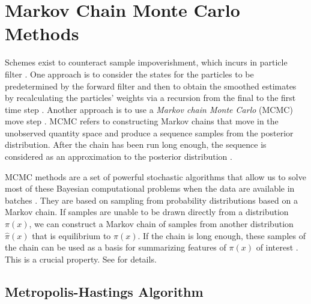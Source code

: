 \section{Markov Chain Monte Carlo Methods}


Schemes exist to counteract sample impoverishment, which incurs in particle filter \citep{ristic2004beyond}. One approach is to consider the states for the particles to be predetermined by the forward filter and then to obtain the smoothed estimates by recalculating the particles' weights via a recursion from the final to the first time step \citep{godsill2000methodology}. Another approach is to use a \textit{Markov chain Monte Carlo} (MCMC) move step \citep{carlin1992monte}. MCMC refers to constructing Markov chains that move in the unobserved quantity space and produce a sequence samples from the posterior distribution. After the chain has been run long enough, the sequence is considered as an approximation to the posterior distribution \citep{kokkala2016particle}. 


MCMC methods are a set of powerful stochastic algorithms that allow us to solve most of these Bayesian computational problems when the data are available in batches \citep{andrieu1999sequential, green1995reversible, andrieu2001model}. They are based on sampling from probability distributions based on a Markov chain. If samples are unable to be drawn directly from a distribution $\pi(x)$, we can construct a Markov chain of samples from another distribution $\hat{\pi}(x)$ that is equilibrium to $\pi(x)$. If the chain is long enough, these samples of the chain can be used as a basis for summarizing features of $\pi(x)$ of interest \citep{smith1993bayesian}. This is a crucial property. See \eg \cite{cappe2009inference, liu2008monte} for details. 




\subsection*{Metropolis-Hastings Algorithm}

